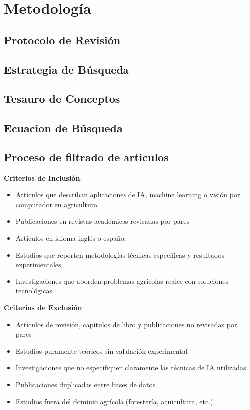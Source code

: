 \documentclass[12pt,a4paper]{article}
\begin{document}
\section{Metodología}

\subsection{Protocolo de Revisión}

\subsection{Estrategia de Búsqueda}

\subsection{Tesauro de Conceptos}

\subsection{Ecuacion de Búsqueda}

\subsection{Proceso de filtrado de articulos}

\textbf{Criterios de Inclusión}:
\begin{itemize}
    \item Artículos que describan aplicaciones de IA, machine learning o visión por computador en agricultura
    \item Publicaciones en revistas académicas revisadas por pares
    \item Artículos en idioma inglés o español
    \item Estudios que reporten metodologías técnicas específicas y resultados experimentales
    \item Investigaciones que aborden problemas agrícolas reales con soluciones tecnológicas
\end{itemize}

\textbf{Criterios de Exclusión}:
\begin{itemize}
    \item Artículos de revisión, capítulos de libro y publicaciones no revisadas por pares
    \item Estudios puramente teóricos sin validación experimental
    \item Investigaciones que no especifiquen claramente las técnicas de IA utilizadas
    \item Publicaciones duplicadas entre bases de datos
    \item Estudios fuera del dominio agrícola (forestería, acuicultura, etc.)
\end{itemize}
\end{document}
